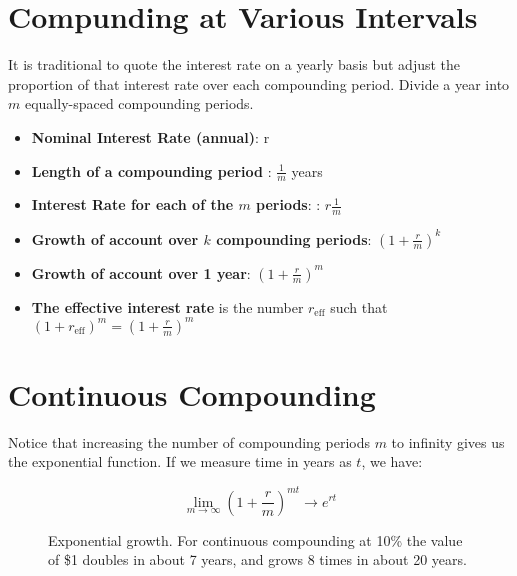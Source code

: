 \section{Compunding at Various Intervals}
It is traditional to quote the interest rate on a yearly basis but adjust the proportion of that interest rate over each compounding period. Divide a year into $m$ equally-spaced compounding periods.
\begin{itemize}
    \item \textbf{Nominal Interest Rate (annual)}: r
    \item \textbf{Length of a compounding period} : \( \frac{1}{m} \) years
    \item \textbf{Interest Rate for each of the $m$ periods}: : \( r \frac{1}{m} \)
    \item \textbf{Growth of account over $k$ compounding periods}: \((1 + \frac{r}{m})^{k} \)
    \item \textbf{Growth of account over 1 year}: \((1 + \frac{r}{m})^{m} \)
    \item \textbf{The effective interest rate} is the number $r_{\text{eff}}$ such that \((1 + r_{\text{eff}})^{m} = (1 + \frac{r}{m})^{m}\)
\end{itemize}

\section{Continuous Compounding}
Notice that increasing the number of compounding periods $m$ to infinity gives us the exponential function. If we measure time in years as $t$, we have:

\begin{equation}
    \lim_{m \to \infty} \left(1 + \frac{r}{m}\right)^{mt} \rightarrow e^{rt}
\end{equation}


\begin{figure}[h!]
    \centering
    \caption{Exponential growth. For continuous compounding at 10\% the value of \$1 doubles in about 7 years, and grows 8 times in about 20 years.}
\end{figure}

